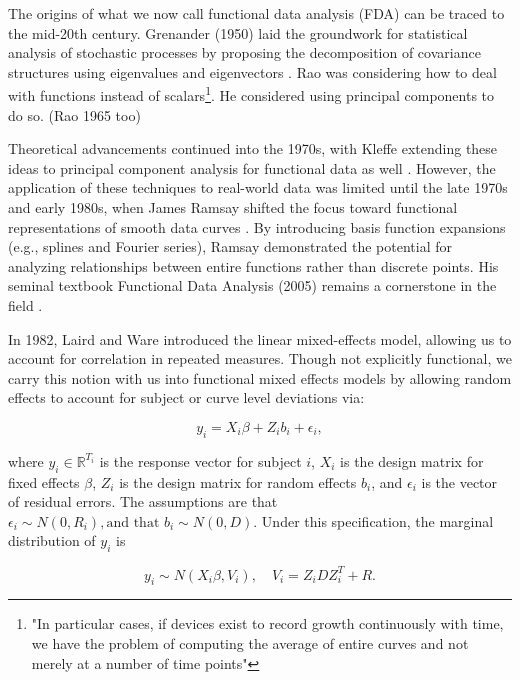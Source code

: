 The origins of what we now call functional data analysis (FDA) can be traced to the mid-20th century.  
Grenander (1950) laid the groundwork for statistical analysis of stochastic processes by proposing the decomposition of covariance structures using eigenvalues and eigenvectors \cite{ulf_grenander_stochastic_1950}.  
Rao was considering how to deal with functions instead of scalars\footnote{"In particular cases, if devices exist to record growth continuously with time, we have the problem of computing the average of entire curves and not merely at a number of time points"}.  
He considered using principal components to do so\cite{rao_statistical_1958}.  (Rao 1965 too)

Theoretical advancements continued into the 1970s, with Kleffe extending these ideas to principal component analysis for functional data as well \cite{kleffe_principal_1973}.  
However, the application of these techniques to real-world data was limited until the late 1970s and early 1980s, when James Ramsay shifted the focus toward functional representations of smooth data curves \cite{ramsay_when_1982}.  
By introducing basis function expansions (e.g., splines and Fourier series), Ramsay demonstrated the potential for analyzing relationships between entire functions rather than discrete points. His seminal textbook Functional Data Analysis (2005) remains a cornerstone in the field \cite{ramsay_functional_2005}.

In 1982, Laird and Ware introduced the linear mixed-effects model, allowing us to account for correlation in repeated measures\cite{laird_random-effects_1982}.  
Though not explicitly functional, we carry this notion with us into functional mixed effects models by allowing random effects to account for subject or curve level deviations via:

\begin{equation}
\label{fda:lmm}
    y_i = X_i \beta + Z_i b_i + \epsilon_i,
\end{equation}

\noindent
where \(y_i \in \mathbb{R}^{T_i}\) is the response vector for subject \(i\), \(X_i\) is the design matrix for fixed effects \(\beta\), \(Z_i\) is the design matrix for random effects $b_i$, and \(\epsilon_i\) is the vector of residual errors.  
The assumptions are that \(\epsilon_i \sim N(0, R_i), \text{and that } b_i \sim N(0, D)\).  
Under this specification, the marginal distribution of $y_i$ is

\begin{equation}
    y_i \sim N(X_i \beta, V_i), \quad V_i = Z_i D Z_i^T + R.
\end{equation}

